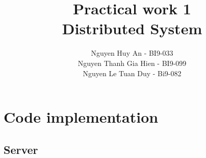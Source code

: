\documentclass{article}
\begin{document}
\title{Practical work 1\protect\\ Distributed System}
\author{Nguyen Huy An - BI9-033\\ Nguyen Thanh Gia Hien - BI9-099 \\ Nguyen Le Tuan Duy - Bi9-082 \\ 
} 

\maketitle

\tableofcontents


\section{Code implementation}
\subsection{Server}
\end{document}

